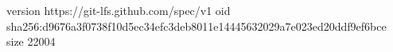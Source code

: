 version https://git-lfs.github.com/spec/v1
oid sha256:d9676a3f0738f10d5ec34efc3deb8011e14445632029a7e023ed20ddf9ef6bce
size 22004

